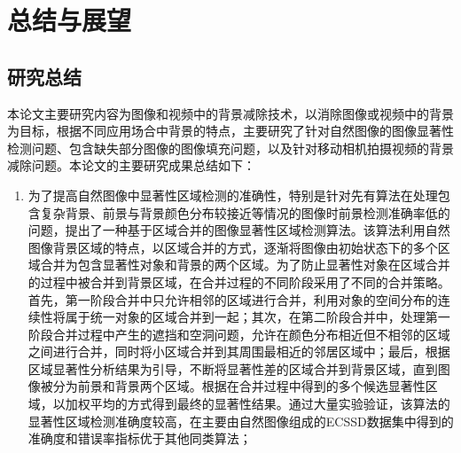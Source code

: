 \chapter{总结与展望}
\label{ch6:Summary}

\section{研究总结}
\label{ch6:sec:summary}
本论文主要研究内容为图像和视频中的背景减除技术，以消除图像或视频中的背景为目标，根据不同应用场合中背景的特点，主要研究了针对自然图像的图像显著性检测问题、包含缺失部分图像的图像填充问题，以及针对移动相机拍摄视频的背景减除问题。本论文的主要研究成果总结如下：
\begin{enumerate}
  \item 为了提高自然图像中显著性区域检测的准确性，特别是针对先有算法在处理包含复杂背景、前景与背景颜色分布较接近等情况的图像时前景检测准确率低的问题，提出了一种基于区域合并的图像显著性区域检测算法。该算法利用自然图像背景区域的特点，以区域合并的方式，逐渐将图像由初始状态下的多个区域合并为包含显著性对象和背景的两个区域。为了防止显著性对象在区域合并的过程中被合并到背景区域，在合并过程的不同阶段采用了不同的合并策略。首先，第一阶段合并中只允许相邻的区域进行合并，利用对象的空间分布的连续性将属于统一对象的区域合并到一起；其次，在第二阶段合并中，处理第一阶段合并过程中产生的遮挡和空洞问题，允许在颜色分布相近但不相邻的区域之间进行合并，同时将小区域合并到其周围最相近的邻居区域中；最后，根据区域显著性分析结果为引导，不断将显著性差的区域合并到背景区域，直到图像被分为前景和背景两个区域。根据在合并过程中得到的多个候选显著性区域，以加权平均的方式得到最终的显著性结果。通过大量实验验证，该算法的显著性区域检测准确度较高，在主要由自然图像组成的ECSSD数据集中得到的准确度和错误率指标优于其他同类算法；


\end{enumerate}
